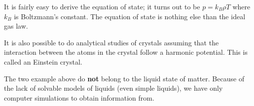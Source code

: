 It is fairly easy to derive the equation of state; it turns out to be
$p = k_B \rho T$ where $k_B$ is Boltzmann's constant. The equation of
state is nothing else than the ideal gas law.

It is also possible to do analytical studies of crystals assuming that
the interaction between the atoms in the crystal follow a harmonic
potential. This is called an Einstein crystal.

The two example above do \textbf{not} belong to the liquid state of
matter. Because of the lack of solvable models of liquids (even simple
liquids), we have only computer simulations to obtain information from.




